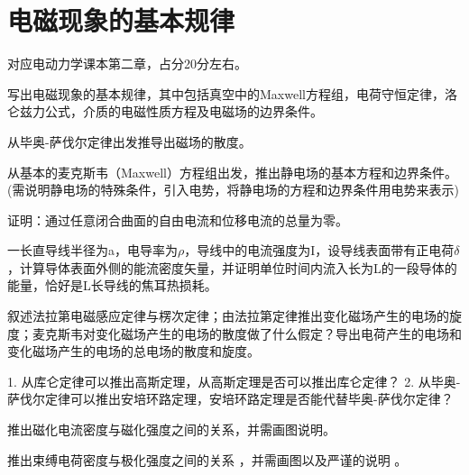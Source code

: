 \section{电磁现象的基本规律}
对应电动力学课本第二章，占分20分左右。

\begin{question}
写出电磁现象的基本规律，其中包括真空中的Maxwell方程组，电荷守恒定律，洛仑兹力公式，介质的电磁性质方程及电磁场的边界条件。
\end{question}

\begin{question} 
从毕奥-萨伐尔定律出发推导出磁场的散度。
\end{question}

\begin{question} 
从基本的麦克斯韦（Maxwell）方程组出发，推出静电场的基本方程和边界条件。
(需说明静电场的特殊条件，引入电势，将静电场的方程和边界条件用电势来表示)
\end{question}

\begin{question} 
证明：通过任意闭合曲面的自由电流和位移电流的总量为零。
\end{question}

\begin{question} 
一长直导线半径为a，电导率为$\rho$，导线中的电流强度为I，设导线表面带有正电荷$\delta$
，计算导体表面外侧的能流密度矢量，并证明单位时间内流入长为L的一段导体的能量，恰好是L长导线的焦耳热损耗。
\end{question}

\begin{question} 叙述法拉第电磁感应定律与楞次定律；由法拉第定律推出变化磁场产生的电场的旋度；麦克斯韦对变化磁场产生的电场的散度做了什么假定？导出电荷产生的电场和变化磁场产生的电场的总电场的散度和旋度。
\end{question}

\begin{question} 1. 从库仑定律可以推出高斯定理，从高斯定理是否可以推出库仑定律？
2. 从毕奥-萨伐尔定律可以推出安培环路定理，安培环路定理是否能代替毕奥-萨伐尔定律？
\end{question}

\begin{question} 推出磁化电流密度与磁化强度之间的关系，并需画图说明。
\end{question}

\begin{question} 推出束缚电荷密度与极化强度之间的关系 ，并需画图以及严谨的说明 。
\end{question}

